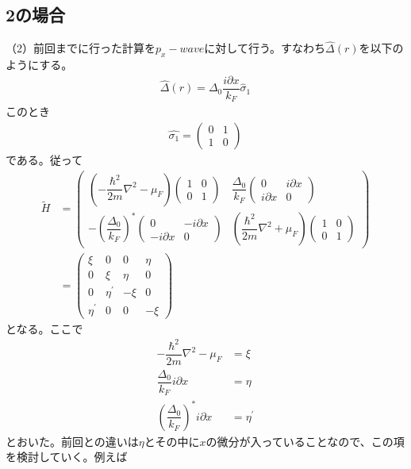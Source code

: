 \documentclass{jarticle}
\begin{document}
\subsection{2の場合}
（2）前回までに行った計算を$p_{x}-wave$に対して行う。すなわち$\hat{\Delta}(r)$を以下のようにする。
\begin{align}
\hat{\Delta}(r)=\Delta_0\dfrac{i\partial x}{k_F}\hat\sigma_1
\end{align}
このとき
\begin{align}
\hat{\sigma_1}=
\begin{pmatrix}
0 & 1\\
1 & 0
\end{pmatrix}
\end{align}
である。従って
\begin{align}
\tilde{H}&=
\begin{pmatrix}
(-\dfrac{\hbar^2}{2m}\nabla^2-\mu_F)\begin{pmatrix}
1 & 0 \\
0 & 1
\end{pmatrix} & \dfrac{\Delta_0}{k_{F}} \begin{pmatrix}
0 & i\partial x \\
i\partial x & 0
\end{pmatrix} \\
-\left(\dfrac{\Delta_0}{k_{F}}\right)^{*}
\begin{pmatrix}
0 & -i\partial x \\
-i\partial x& 0
\end{pmatrix} & (\dfrac{\hbar^2}{2m}\nabla^2+\mu_F)\begin{pmatrix}
1 & 0 \\
0 & 1
\end{pmatrix}
\end{pmatrix}
\\&=\begin{pmatrix}
\xi & 0 & 0 & \eta \\ 
0 & \xi & \eta & 0 \\ 
0 & \eta^{'} & -\xi & 0 \\ 
\eta^{'} & 0 & 0 & -\xi
\end{pmatrix} 
\end{align}
となる。ここで
\begin{align}
-\dfrac{\hbar^2}{2m}\nabla^2-\mu_F&=\xi\\
\dfrac{\Delta_0}{k_{F}}i\partial x&=\eta\\
\left(\dfrac{\Delta_0}{k_{F}}\right)^{*}i\partial x&=\eta^{'}
\end{align}
とおいた。前回との違いは$\eta$とその中に$x$の微分が入っていることなので、この項を検討していく。例えば
\end{document}
